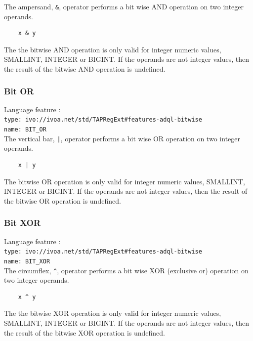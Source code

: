 \documentclass[11pt,a4paper]{ivoa}
\begin{document}
The ampersand, \verb:&:, operator performs a bit wise AND operation
on two integer operands.

\begin{verbatim}
    x & y
\end{verbatim}

The the bitwise AND operation is only valid for integer numeric values,
SMALLINT, INTEGER or BIGINT.
If the operands are not integer values, then the result of the bitwise
AND operation is undefined.

\subsubsection{Bit OR}
\label{sec:bitwise.or}
{\footnotesize Language feature :}\\
{\footnotesize \verb|type: ivo://ivoa.net/std/TAPRegExt#features-adql-bitwise|}\\
{\footnotesize \verb|name: BIT_OR|}\\

The vertical bar, \verb:|:, operator performs a bit wise OR operation
on two integer operands.

\begin{verbatim}
    x | y
\end{verbatim}

The bitwise OR operation is only valid for integer numeric values, 
SMALLINT, INTEGER or BIGINT.
If the operands are not integer values, then the result of the bitwise OR
operation is undefined.

\subsubsection{Bit XOR}
\label{sec:bitwise.xor}
{\footnotesize Language feature :}\\
{\footnotesize \verb|type: ivo://ivoa.net/std/TAPRegExt#features-adql-bitwise|}\\
{\footnotesize \verb|name: BIT_XOR|}\\

The circumflex, \verb:^:, operator performs a bit wise XOR (exclusive or)
operation on two integer operands.

\begin{verbatim}
    x ^ y
\end{verbatim}

The the bitwise XOR operation is only valid for integer numeric values, 
SMALLINT, INTEGER or BIGINT.
If the operands are not integer values, then the result of the bitwise
XOR operation is undefined.
\end{document}
